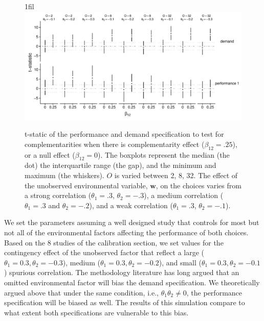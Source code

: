 \documentclass[12pt]{article}
\makeatletter
\newcommand*{\centerfloat}{%
  \parindent \z@
  \leftskip \z@ \@plus 1fil \@minus \textwidth
  \rightskip\leftskip
  \parfillskip \z@skip}
\makeatother
\begin{document}
\begin{figure}
\centerfloat
\includegraphics[width=450px]{figure-latex/spurious_plot.pdf}
\caption[Error Rate and Power with Unobserved Environmental Variables]
{\label{spurious} t-static of the performance and demand specification to test
for complementarities when there is complementarity effect ($\beta_{12} = .25$),
or a null effect ($\beta_{12} = 0$). The boxplots represent the median (the dot) the
interquartile range (the gap), and the minimum and maximum (the whiskers). $O$
is varied between 2, 8, 32. The effect of the unobserved environmental variable,
$\mathbf{w}$, on the choices varies from a strong correlation ($\theta_1 = .3$,
$\theta_2 = -.3$), a medium correlation ($\theta_1 = .3$ and $\theta_2 = -.2$),
and a weak correlation ($\theta_1 =.3$, $\theta_2 = -.1$).}
\end{figure}



We set the parameters assuming a well designed study that controls for most but not all of the environmental factors affecting the performance of both choices. Based on the 8 studies of the calibration section, we set values for the contingency effect of the unobserved factor that reflect a large ($\theta_1 = 0.3, \theta_2 = -0.3$), medium ($\theta_1 = 0.3, \theta_2 = -0.2$), and small ($\theta_1 = 0.3, \theta_2 = -0.1$) spurious correlation. The methodology literature has long argued that an omitted environmental factor will bias the demand specification. We theoretically argued above that under the same condition, i.e., $\theta_1 \theta_2 \neq 0$, the performance specification will be biased as well. The results of this simulation compare to what extent both specifications are vulnerable to this bias.
\end{document}
